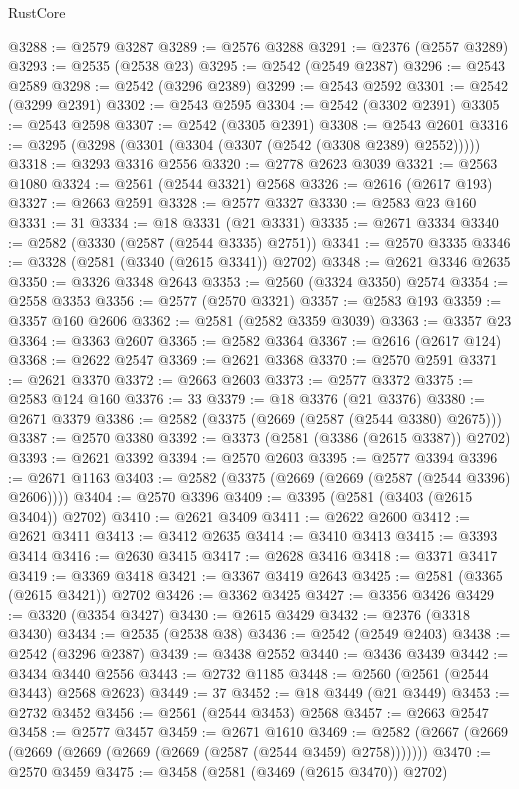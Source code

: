 \begin{lexlean}{RustCore}
\begin{coremodule}
@3288 := @2579 @3287
@3289 := @2576 @3288
@3291 := @2376 (@2557 @3289)
@3293 := @2535 (@2538 @23)
@3295 := @2542 (@2549 @2387)
@3296 := @2543 @2589
@3298 := @2542 (@3296 @2389)
@3299 := @2543 @2592
@3301 := @2542 (@3299 @2391)
@3302 := @2543 @2595
@3304 := @2542 (@3302 @2391)
@3305 := @2543 @2598
@3307 := @2542 (@3305 @2391)
@3308 := @2543 @2601
@3316 := @3295 (@3298 (@3301 (@3304 (@3307 (@2542 (@3308 @2389) @2552)))))
@3318 := @3293 @3316 @2556
@3320 := @2778 @2623 @3039
@3321 := @2563 @1080
@3324 := @2561 (@2544 @3321) @2568
@3326 := @2616 (@2617 @193)
@3327 := @2663 @2591
@3328 := @2577 @3327
@3330 := @2583 @23 @160
@3331 := 31
@3334 := @18 @3331 (@21 @3331)
@3335 := @2671 @3334
@3340 := @2582 (@3330 (@2587 (@2544 @3335) @2751))
@3341 := @2570 @3335
@3346 := @3328 (@2581 (@3340 (@2615 @3341)) @2702)
@3348 := @2621 @3346 @2635
@3350 := @3326 @3348 @2643
@3353 := @2560 (@3324 @3350) @2574
@3354 := @2558 @3353
@3356 := @2577 (@2570 @3321)
@3357 := @2583 @193
@3359 := @3357 @160 @2606
@3362 := @2581 (@2582 @3359 @3039)
@3363 := @3357 @23
@3364 := @3363 @2607
@3365 := @2582 @3364
@3367 := @2616 (@2617 @124)
@3368 := @2622 @2547
@3369 := @2621 @3368
@3370 := @2570 @2591
@3371 := @2621 @3370
@3372 := @2663 @2603
@3373 := @2577 @3372
@3375 := @2583 @124 @160
@3376 := 33
@3379 := @18 @3376 (@21 @3376)
@3380 := @2671 @3379
@3386 := @2582 (@3375 (@2669 (@2587 (@2544 @3380) @2675)))
@3387 := @2570 @3380
@3392 := @3373 (@2581 (@3386 (@2615 @3387)) @2702)
@3393 := @2621 @3392
@3394 := @2570 @2603
@3395 := @2577 @3394
@3396 := @2671 @1163
@3403 := @2582 (@3375 (@2669 (@2669 (@2587 (@2544 @3396) @2606))))
@3404 := @2570 @3396
@3409 := @3395 (@2581 (@3403 (@2615 @3404)) @2702)
@3410 := @2621 @3409
@3411 := @2622 @2600
@3412 := @2621 @3411
@3413 := @3412 @2635
@3414 := @3410 @3413
@3415 := @3393 @3414
@3416 := @2630 @3415
@3417 := @2628 @3416
@3418 := @3371 @3417
@3419 := @3369 @3418
@3421 := @3367 @3419 @2643
@3425 := @2581 (@3365 (@2615 @3421)) @2702
@3426 := @3362 @3425
@3427 := @3356 @3426
@3429 := @3320 (@3354 @3427)
@3430 := @2615 @3429
@3432 := @2376 (@3318 @3430)
@3434 := @2535 (@2538 @38)
@3436 := @2542 (@2549 @2403)
@3438 := @2542 (@3296 @2387)
@3439 := @3438 @2552
@3440 := @3436 @3439
@3442 := @3434 @3440 @2556
@3443 := @2732 @1185
@3448 := @2560 (@2561 (@2544 @3443) @2568 @2623)
@3449 := 37
@3452 := @18 @3449 (@21 @3449)
@3453 := @2732 @3452
@3456 := @2561 (@2544 @3453) @2568
@3457 := @2663 @2547
@3458 := @2577 @3457
@3459 := @2671 @1610
@3469 := @2582 (@2667 (@2669 (@2669 (@2669 (@2669 (@2669 (@2587 (@2544 @3459) @2758)))))))
@3470 := @2570 @3459
@3475 := @3458 (@2581 (@3469 (@2615 @3470)) @2702)

\end{coremodule}
\end{lexlean}
